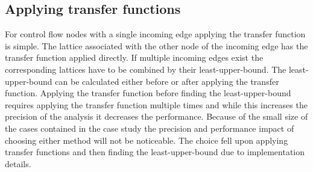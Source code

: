 \begin{comment}
Since our lattice does not keep indices for list type arrays any read from a list array will return a joined value of all the locations in the list. Whereas a read from a map array will result in the joined value of the index and the top index element. If the index element is a top element it will join the locations for the top index element and all index elements contained in the top element.

Array indices can be either strings or integers and as such reside in either the Number or String part of our lattice. A value that can be either string or integer coerced to a single index lattice element will have to be the top element. To get more precision an index lattice element is created for each possible value.
\end{comment}


\subsection{Applying transfer functions}
For control flow nodes with a single incoming edge applying the transfer function is simple. The lattice associated with the other node of the incoming edge has the transfer function applied directly. If multiple incoming edges exist the corresponding lattices have to be combined by their least-upper-bound. The least-upper-bound can be calculated either before or after applying the transfer function. Applying the transfer function before finding the least-upper-bound requires applying the transfer function multiple times and while this increases the precision of the analysis it decreases the performance. Because of the small size of the cases contained in the case study the precision and performance impact of choosing either method will not be noticeable. The choice fell upon applying transfer functions and then finding the least-upper-bound due to implementation details.


